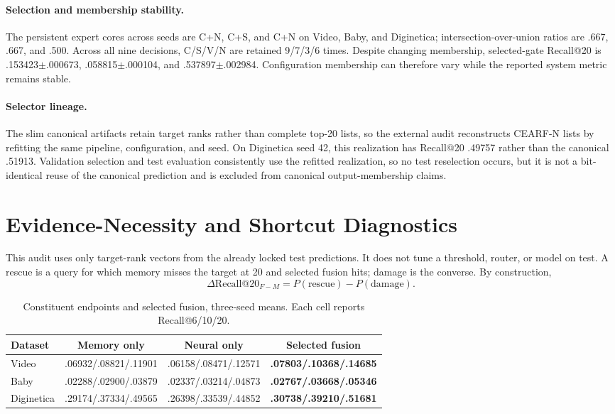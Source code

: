 \documentclass[runningheads]{llncs}
\begin{document}
\paragraph{Selection and membership stability.}
The persistent expert cores across seeds are C+N, C+S, and C+N on Video,
Baby, and Diginetica; intersection-over-union ratios are .667, .667, and
.500. Across all nine decisions, C/S/V/N are retained 9/7/3/6 times. Despite
changing membership, selected-gate Recall@20 is
.153423$\pm$.000673, .058815$\pm$.000104, and
.537897$\pm$.002984. Configuration membership can therefore vary while the
reported system metric remains stable.

\paragraph{Selector lineage.}
The slim canonical artifacts retain target ranks rather than complete top-20
lists, so the external audit reconstructs CEARF-N lists by refitting the same
pipeline, configuration, and seed. On Diginetica seed 42, this realization
has Recall@20 .49757 rather than the canonical .51913. Validation selection
and test evaluation consistently use the refitted realization, so no test
reselection occurs, but it is not a bit-identical reuse of the canonical
prediction and is excluded from canonical output-membership claims.

\section{Evidence-Necessity and Shortcut Diagnostics}
This audit uses only target-rank vectors from the already locked test
predictions. It does not tune a threshold, router, or model on test. A rescue
is a query for which memory misses the target at 20 and selected fusion hits;
damage is the converse. By construction,
\[
\Delta\mathrm{Recall@20}_{F-M}
  = P(\mathrm{rescue})-P(\mathrm{damage}).
\]

\begin{table}[H]
\caption{Constituent endpoints and selected fusion, three-seed means.
Each cell reports Recall@6/10/20.}
\centering\small
\begin{tabular}{lccc}
\toprule
Dataset & Memory only & Neural only & Selected fusion\\
\midrule
Video & .06932/.08821/.11901 & .06158/.08471/.12571 &
\textbf{.07803/.10368/.14685}\\
Baby & .02288/.02900/.03879 & .02337/.03214/.04873 &
\textbf{.02767/.03668/.05346}\\
Diginetica & .29174/.37334/.49565 & .26398/.33539/.44852 &
\textbf{.30738/.39210/.51681}\\
\bottomrule
\end{tabular}
\end{table}
\end{document}
